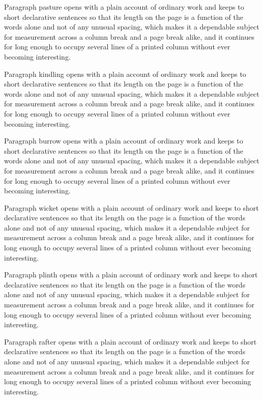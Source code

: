 \documentclass{article}
\begin{document}
Paragraph pasture opens with a plain account of ordinary work and keeps to short declarative sentences so that its length on the page is a function of the words alone and not of any unusual spacing, which makes it a dependable subject for measurement across a column break and a page break alike, and it continues for long enough to occupy several lines of a printed column without ever becoming interesting.

Paragraph kindling opens with a plain account of ordinary work and keeps to short declarative sentences so that its length on the page is a function of the words alone and not of any unusual spacing, which makes it a dependable subject for measurement across a column break and a page break alike, and it continues for long enough to occupy several lines of a printed column without ever becoming interesting.

Paragraph burrow opens with a plain account of ordinary work and keeps to short declarative sentences so that its length on the page is a function of the words alone and not of any unusual spacing, which makes it a dependable subject for measurement across a column break and a page break alike, and it continues for long enough to occupy several lines of a printed column without ever becoming interesting.

Paragraph wicket opens with a plain account of ordinary work and keeps to short declarative sentences so that its length on the page is a function of the words alone and not of any unusual spacing, which makes it a dependable subject for measurement across a column break and a page break alike, and it continues for long enough to occupy several lines of a printed column without ever becoming interesting.

Paragraph plinth opens with a plain account of ordinary work and keeps to short declarative sentences so that its length on the page is a function of the words alone and not of any unusual spacing, which makes it a dependable subject for measurement across a column break and a page break alike, and it continues for long enough to occupy several lines of a printed column without ever becoming interesting.

Paragraph rafter opens with a plain account of ordinary work and keeps to short declarative sentences so that its length on the page is a function of the words alone and not of any unusual spacing, which makes it a dependable subject for measurement across a column break and a page break alike, and it continues for long enough to occupy several lines of a printed column without ever becoming interesting.
\end{document}
